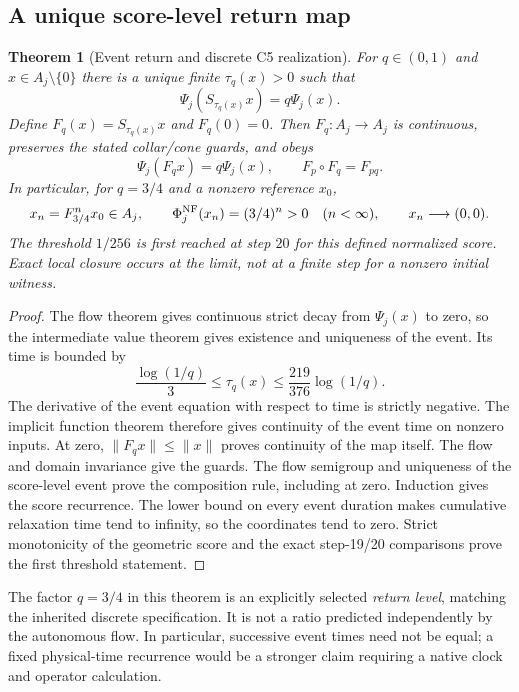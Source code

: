 \documentclass[11pt,a4paper]{article}
\newtheorem{theorem}{Theorem}
\begin{document}
\subsection{A unique score-level return map}
\begin{theorem}[Event return and discrete C5 realization]
\label{thm:local-c5-event-return}
For $q\in(0,1)$ and $x\in A_j\setminus\{0\}$ there is a unique finite
$\tau_q(x)>0$ such that
\[
\Psi_j(S_{\tau_q(x)}x)=q\Psi_j(x).
\]
Define $F_q(x)=S_{\tau_q(x)}x$ and $F_q(0)=0$. Then $F_q:A_j\to A_j$
is continuous, preserves the stated collar/cone guards, and obeys
\[
\Psi_j(F_qx)=q\Psi_j(x),\qquad
F_p\circ F_q=F_{pq}.
\]
In particular, for $q=3/4$ and a nonzero reference $x_0$,
\[
x_n=F_{3/4}^n x_0\in A_j,\qquad
\Phi^{\rm NF}_j(x_n)=(3/4)^n>0\quad(n<\infty),
\qquad x_n\longrightarrow(0,0).
\]
The threshold $1/256$ is first reached at step $20$ for this defined
normalized score. Exact local closure occurs at the limit, not at a finite
step for a nonzero initial witness.
\end{theorem}
\begin{proof}
The flow theorem gives continuous strict decay from $\Psi_j(x)$ to zero,
so the intermediate value theorem gives existence and uniqueness of the
event. Its time is bounded by
\[
\frac{\log(1/q)}3\le\tau_q(x)
\le\frac{219}{376}\log(1/q).
\]
The derivative of the event equation with respect to time is strictly
negative. The implicit function theorem therefore gives continuity of the
event time on nonzero inputs. At zero, $\|F_qx\|\le\|x\|$ proves
continuity of the map itself. The flow and domain invariance give the guards.
The flow semigroup and uniqueness of the score-level event prove the
composition rule, including at zero. Induction gives the score recurrence.
The lower bound on every event duration makes cumulative relaxation time
tend to infinity, so the coordinates tend to zero. Strict monotonicity of
the geometric score and the exact step-19/20 comparisons prove the first
threshold statement.
\end{proof}

The factor $q=3/4$ in this theorem is an explicitly selected \emph{return
level}, matching the inherited discrete specification. It is not a ratio
predicted independently by the autonomous flow. In particular, successive
event times need not be equal; a fixed physical-time recurrence would be a
stronger claim requiring a native clock and operator calculation.
\end{document}
